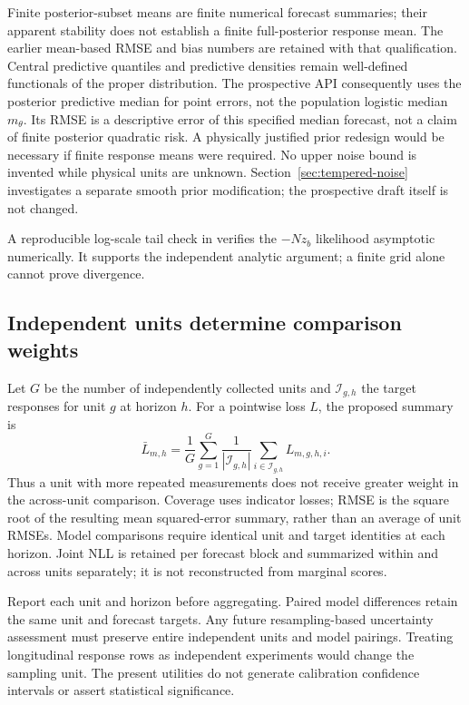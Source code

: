     Finite posterior-subset means are finite numerical forecast summaries;
    their apparent stability does not establish a finite full-posterior
    response mean. The earlier mean-based RMSE and bias numbers are retained
    with that qualification. Central predictive quantiles and predictive
    densities remain well-defined functionals of the proper distribution.
    The prospective API consequently uses the posterior predictive median
    for point errors, not the population logistic median \(m_\theta\).
    Its RMSE is a descriptive error of this specified median forecast, not
    a claim of finite posterior quadratic risk. A physically justified prior
    redesign would be necessary if finite response means were required.
    No upper noise bound is invented while physical units are unknown.
    Section~\ref{sec:tempered-noise} investigates a separate smooth
    prior modification; the prospective draft itself is not changed.

    A reproducible log-scale tail check in
     verifies the
    \(-N z_b\) likelihood asymptotic numerically. It supports the independent
    analytic argument; a finite grid alone cannot prove divergence.

\subsection{Independent units determine comparison weights}

    Let \(G\) be the number of independently collected units and
    \(\mathcal I_{g,h}\) the target responses for unit \(g\) at horizon \(h\).
    For a pointwise loss \(L\), the proposed summary is
    \[
        \bar L_{m,h}
        =\frac{1}{G}\sum_{g=1}^{G}
            \frac{1}{|\mathcal I_{g,h}|}
            \sum_{i\in\mathcal I_{g,h}}L_{m,g,h,i}.
    \]
    Thus a unit with more repeated measurements does not receive greater
    weight in the across-unit comparison. Coverage uses indicator losses;
    RMSE is the square root of the resulting mean squared-error summary,
    rather than an average of unit RMSEs. Model comparisons require identical
    unit and target identities at each horizon. Joint NLL is retained per
    forecast block and summarized within and across units separately; it is
    not reconstructed from marginal scores.

    Report each unit and horizon before aggregating. Paired model differences
    retain the same unit and forecast targets. Any future resampling-based
    uncertainty assessment must preserve entire independent units and model
    pairings. Treating longitudinal response rows as independent experiments
    would change the sampling unit. The present utilities do not generate
    calibration confidence intervals or assert statistical significance.

